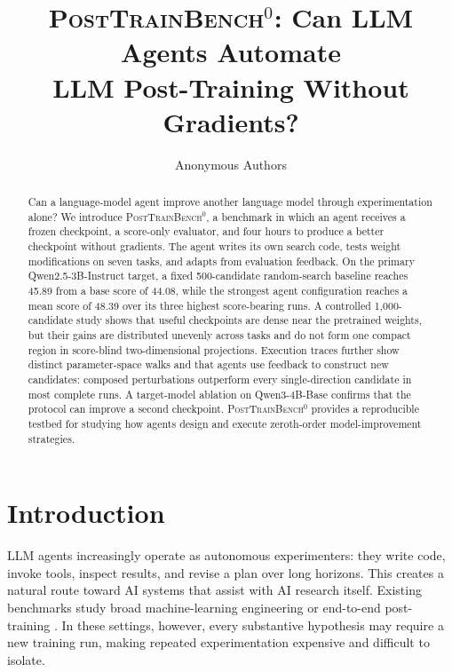 \documentclass{article}
\title{\textsc{PostTrainBench}$^{0}$: Can LLM Agents Automate\\
LLM Post-Training Without Gradients?}
\author{Anonymous Authors}
\newcommand{\bench}{\textsc{PostTrainBench}$^{0}$}
\begin{document}
\maketitle

\begin{abstract}
Can a language-model agent improve another language model through experimentation alone?
We introduce \bench, a benchmark in which an agent receives a frozen checkpoint, a
score-only evaluator, and four hours to produce a better checkpoint without gradients.
The agent writes its own search code, tests weight modifications on seven tasks, and adapts
from evaluation feedback. On the primary Qwen2.5-3B-Instruct target, a fixed 500-candidate
random-search baseline reaches 45.89 from a base score of 44.08, while the strongest agent
configuration reaches a mean score of 48.39 over its three highest score-bearing runs. A controlled 1,000-candidate study shows that
useful checkpoints are dense near the pretrained weights, but their gains are distributed
unevenly across tasks and do not form one compact region in score-blind two-dimensional
projections. Execution traces further show distinct parameter-space walks and that agents
use feedback to construct new candidates: composed perturbations outperform every
single-direction candidate in most complete runs. A target-model ablation on
Qwen3-4B-Base confirms that the protocol can improve a second checkpoint. \bench{} provides
a reproducible testbed for studying how agents design and execute zeroth-order
model-improvement strategies.
\end{abstract}

\section{Introduction}

LLM agents increasingly operate as autonomous experimenters: they write code, invoke
tools, inspect results, and revise a plan over long horizons. This creates a natural route
toward AI systems that assist with AI research itself. Existing benchmarks study broad
machine-learning engineering or end-to-end post-training
\citep{huang2023mlagentbench,chan2024mlebench,rank2026posttrainbench}. In these settings,
however, every substantive hypothesis may require a new training run, making repeated
experimentation expensive and difficult to isolate.
\end{document}
